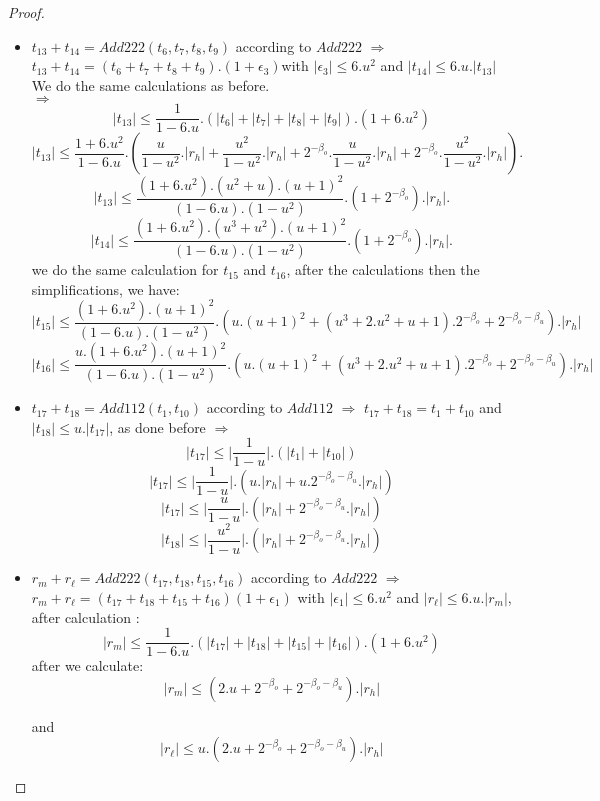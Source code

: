 \begin{proof}
\begin{itemize}
    \item $t_{13} + t_{14} = Add222(t_6, t_7, t_8, t_9)$ according to $Add222$ 
    $\Rightarrow$ $t_{13} + t_{14} = (t_6+ t_7+ t_8 +t_9).(1 + \epsilon_3)$with 
    $\lvert \epsilon_3 \rvert \le 6.u^2$ and $\lvert t_{14} \rvert \le 6.u.\lvert t_{13} \rvert$ \\
    We do the same calculations as before.\\
    $\Rightarrow$ 
    $$\lvert t_{13} \rvert \le \frac{1}{1-6.u}.(\lvert t_6 \rvert + \lvert t_7 \rvert + \lvert t_8 \rvert + \lvert t_9 \rvert).(1 + 6.u^2)$$
    $$\lvert t_{13} \rvert \le \frac{1 + 6.u^2}{1-6.u}.(\frac{u}{1-u^2}. \lvert r_h \rvert + \frac{u^2}{1-u^2}. \lvert r_h \rvert + 2^{-\beta_o}. \frac{u}{1-u^2}. \lvert r_h \rvert + 2^{-\beta_o}. \frac{u^2}{1-u^2}. \lvert r_h \rvert).$$
    $$\lvert t_{13} \rvert \le \frac{(1 + 6.u^2).(u^2+u).(u+1)^2}{(1-6.u).(1-u^2)}.(1 +  2^{-\beta_o}) .\lvert r_h \rvert.$$
    $$\lvert t_{14} \rvert \le \frac{(1 + 6.u^2).(u^3+u^2).(u+1)^2}{(1-6.u).(1-u^2)}.(1 +  2^{-\beta_o}) .\lvert r_h \rvert.$$
    we do the same calculation for $t_{15}$ and $t_{16}$, after the calculations then the simplifications, we have:
    $$\lvert t_{15} \rvert \le \frac{(1+6.u^2).(u+1)^2}{(1-6.u).(1-u^2)}.(u.(u+1)^2 + (u^3+2.u^2+u+1).2^{-\beta_o} +2^{-\beta_o -\beta_u}). \lvert r_h \rvert$$
    $$\lvert t_{16} \rvert \le \frac{u.(1+6.u^2).(u+1)^2}{(1-6.u).(1-u^2)}.(u.(u+1)^2 + (u^3+2.u^2+u+1).2^{-\beta_o} +2^{-\beta_o -\beta_u}). \lvert r_h \rvert$$
    \item $t_{17} +t_{18} = Add112(t_1,t_{10})$ according to $Add112$ $\Rightarrow$
    $t_{17} +t_{18} = t_1+t_{10}$ and $\lvert t_{18} \rvert \le u.\lvert t_{17} \rvert$, as done before  $\Rightarrow$
    $$\lvert t_{17} \rvert \le \lvert \frac{1}{1-u} \rvert .(\lvert t_1 \rvert + \lvert t_{10} \rvert)$$
    $$\lvert t_{17} \rvert \le \lvert \frac{1}{1-u} \rvert .(u. \lvert r_h \rvert + u.2^{-\beta_o -\beta_u}. \lvert r_h \rvert)$$
    $$\lvert t_{17} \rvert \le \lvert \frac{u}{1-u} \rvert .(\lvert r_h \rvert + 2^{-\beta_o -\beta_u}. \lvert r_h \rvert)$$
   $$\lvert t_{18} \rvert \le \lvert \frac{u^2}{1-u} \rvert .(\lvert r_h \rvert + 2^{-\beta_o -\beta_u}. \lvert r_h \rvert)$$
    \item $r_m+r_{\ell} = Add222(t_{17},t_{18},t_{15},t_{16})$ according to $Add222$ $\Rightarrow$ $r_m+r_{\ell} = (t_{17}+t_{18}+t_{15}+t_{16})(1+\epsilon_1)$ with $\lvert \epsilon_1 \rvert \le 6.u^2$ and $\lvert r_{\ell} \rvert \le 6.u.\lvert r_m \rvert $, after calculation :
    $$\lvert r_m \rvert \le \frac{1}{1-6.u}.(\lvert t_{17} \rvert + \lvert t_{18} \rvert + \lvert t_{15} \rvert + \lvert t_{16} \rvert).(1 + 6.u^2)$$
    after we calculate:
    $$\lvert r_m \rvert \le (2.u + 2^{-\beta_o} +2^{-\beta_o -\beta_u}). \lvert r_h \rvert$$
    
    and 
    $$\lvert r_{\ell} \rvert \le u.(2.u + 2^{-\beta_o} +2^{-\beta_o -\beta_u}). \lvert r_h \rvert$$
\end{itemize}
\end{proof}


